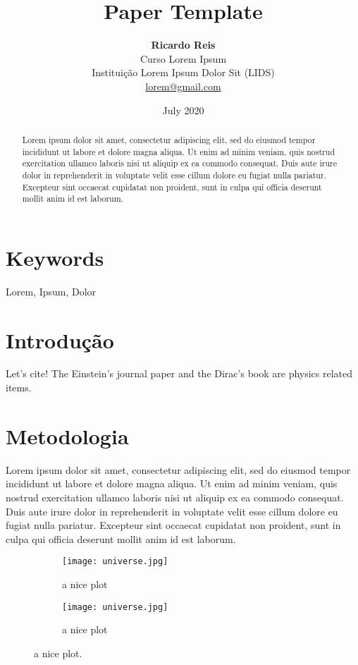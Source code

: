 \documentclass[10pt, a4paper,twocolumn]{article}
\title{
    \textbf{Paper Template} %
    }
\author{
    \textbf{Ricardo Reis} \\
    {\small Curso Lorem Ipsum} \\ %
    {\small Instituição Lorem Ipsum Dolor Sit (LIDS)} \\
    {\small \href{mailto:lorem@gmail.com}{lorem@gmail.com }}
    }
\date{July 2020}
\begin{document}
\maketitle

\begin{abstract}
Lorem ipsum dolor sit amet, consectetur adipiscing elit, sed do eiusmod tempor incididunt ut labore et dolore magna aliqua. Ut enim ad minim veniam, quis nostrud exercitation ullamco laboris nisi ut aliquip ex ea commodo consequat. Duis aute irure dolor in reprehenderit in voluptate velit esse cillum dolore eu fugiat nulla pariatur. Excepteur sint occaecat cupidatat non proident, sunt in culpa qui officia deserunt mollit anim id est laborum.
\end{abstract}

\section*{Keywords}
Lorem, Ipsum, Dolor

\section{Introdução}
Let's cite! The Einstein's journal paper \cite{einstein} and the Dirac's 
book \cite{dirac} are physics related items. 

\section{Metodologia}
Lorem ipsum dolor sit amet, consectetur adipiscing elit, sed do eiusmod tempor incididunt ut labore et dolore magna aliqua. Ut enim ad minim veniam, quis nostrud exercitation ullamco laboris nisi ut aliquip ex ea commodo consequat. Duis aute irure dolor in reprehenderit in voluptate velit esse cillum dolore eu fugiat nulla pariatur. Excepteur sint occaecat cupidatat non proident, sunt in culpa qui officia deserunt mollit anim id est laborum.

\begin{figure}[h]
\begin{subfigure}{0.23\textwidth}
\texttt{[image: universe.jpg]} 
\caption{a nice plot}
\label{fig:subim1}
\end{subfigure}
\begin{subfigure}{0.23\textwidth}
\texttt{[image: universe.jpg]}
\caption{a nice plot}
\label{fig:subim2}
\end{subfigure}
\caption{a nice plot.}
\label{fig:image2}
\end{figure}
\end{document}

